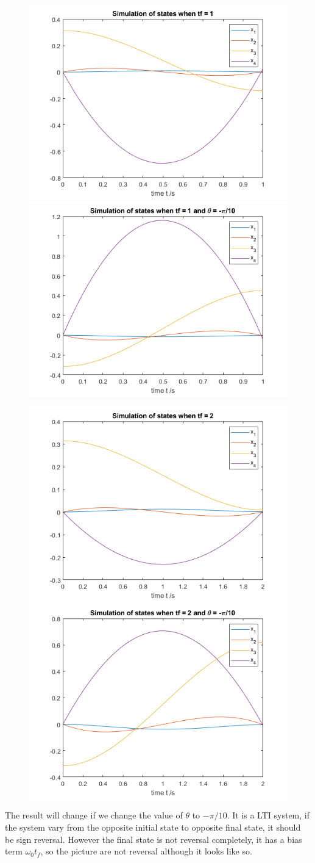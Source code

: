 \documentclass{article}
\begin{document}
\begin{figure}[H]
\includegraphics[width=0.5\linewidth]{simulation_tf_1.png}
\includegraphics[width=0.5\linewidth]{simulation_tf_1_m.png}
\end{figure}

\begin{figure}[H]
\includegraphics[width=0.5\linewidth]{simulation_tf_2.png}
\includegraphics[width=0.5\linewidth]{simulation_tf_2_m.png}
\end{figure}

The result will change if we change the value of $\theta$ to $-\pi/10$. It is a LTI system, if the system vary from the opposite initial state to opposite final state, it should be sign reversal. However the final state is not reversal completely, it has a bias term $\omega_0 t_f$, so the picture are not reversal although it looks like so. 
\end{document}
